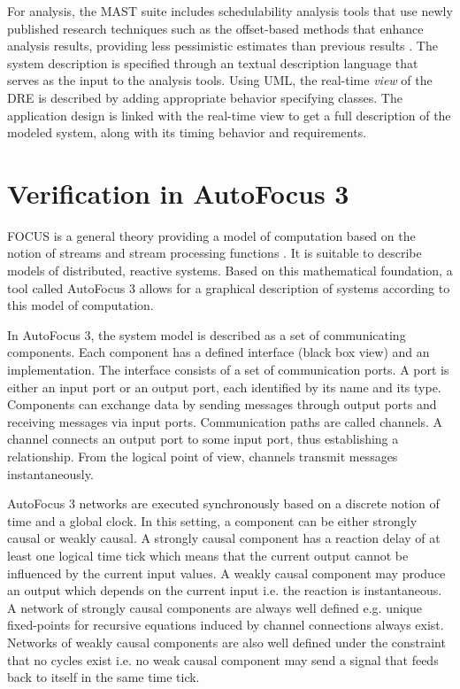 For analysis, the MAST suite includes schedulability analysis tools that use
newly published research techniques such as the offset-based methods
\cite{palencia1998schedulability} that enhance analysis results, providing less
pessimistic estimates than previous results \cite{tindell1994holistic}. The
system description is specified through an textual description language that
serves as the input to the analysis tools. Using UML, the real-time \emph{view}
of the DRE is described \cite{selic2000generic} by adding appropriate behavior
specifying classes. The application design is linked with the real-time view to
get a full description of the modeled system, along with its timing behavior and
requirements.

\section{Verification in AutoFocus 3}

FOCUS is a general theory providing a model of computation based on the notion
of streams and stream processing functions \cite{broy2012specification}. It is
suitable to describe models of distributed, reactive systems. Based on this
mathematical foundation, a tool called AutoFocus 3 \cite{huber1996autofocus}
allows for a graphical description of systems according to this model of
computation.

In AutoFocus 3, the system model is described as a set of communicating
components. Each component has a defined interface (black box view) and an
implementation. The interface consists of a set of communication ports. A port
is either an input port or an output port, each identified by its name and its
type. Components can exchange data by sending messages through output ports and
receiving messages via input ports. Communication paths are called channels. A
channel connects an output port to some input port, thus establishing a
relationship. From the logical point of view, channels transmit messages
instantaneously.

AutoFocus 3 networks are executed synchronously based on a discrete notion of
time and a global clock. In this setting, a component can be either strongly
causal or weakly causal. A strongly causal component has a reaction delay of at
least one logical time tick which means that the current output cannot be
influenced by the current input values. A weakly causal component may produce an
output which depends on the current input i.e. the reaction is instantaneous. A
network of strongly causal components are always well defined e.g. unique
fixed-points for recursive equations induced by channel connections always
exist. Networks of weakly causal components are also well defined under the
constraint that no cycles exist i.e. no weak causal component may send a signal
that feeds back to itself in the same time tick.

